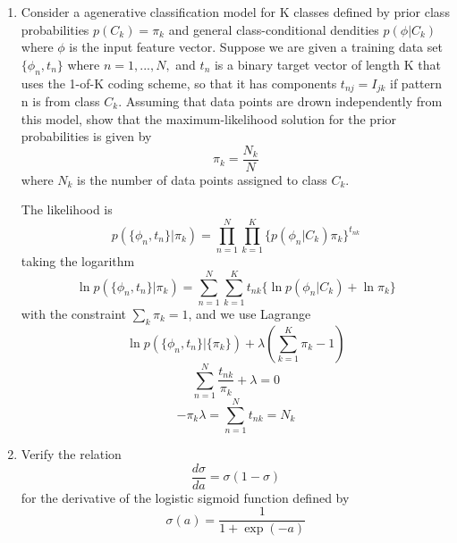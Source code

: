\documentclass[a4paper]{article}
\begin{document}
\begin{enumerate}
		\item
		Consider a agenerative classification model for K classes defined by prior class probabilities $p(C_k)=\pi_k$ and general class-conditional dendities $p(\phi | C_k)$ where $\phi$ is the input feature vector. Suppose we are given a training data set$\{\phi_n,t_n\}$ where $n=1,...,N,$ and $t_n$ is a binary target vector of length K that uses the 1-of-K coding scheme, so that it has components $t_{nj} = I_{jk}$ if pattern n is from class $C_k$. Assuming that data points are drown independently from this model, show that the maximum-likelihood solution for the prior probabilities is given by
		\begin{equation*}
			\pi_k = \frac{N_k}{N}
		\end{equation*}
		where $N_k$ is the number of data points assigned to class $C_k$.
		\begin{solution}
			The likelihood is 
			\begin{equation*}
				p(\{\phi_n,t_n\}|{\pi_k})=\prod_{n=1}^{N}\prod_{k=1}^{K}\{p(\phi_n|C_k)\pi_k\}^{t_{nk}}
			\end{equation*}
			taking the logarithm
			\begin{equation*}
				\ln p(\{\phi_n,t_n\}|{\pi_k})=\sum_{n=1}^{N}\sum_{k=1}^{K}t_{nk}\{\ln p(\phi_n|C_k)+\ln \pi_k\}
			\end{equation*}
			with the constraint $\sum_k \pi_k=1$, and we use Lagrange
			\begin{equation*}
				\ln p(\{\phi_n,t_n\}|\{\pi_k\})+\lambda(\sum_{k=1}^{K}\pi_k-1)
			\end{equation*}
			\begin{equation*}
				\sum_{n=1}^{N}\frac{t_{nk}}{\pi_k} + \lambda = 0
			\end{equation*}
			\begin{equation*}
				-\pi_k\lambda = \sum_{n=1}^{N}t_{nk}=N_k
			\end{equation*}
		\end{solution}
		\item 
		Verify the relation
		\begin{equation*}
			\frac{d\sigma}{da}=\sigma(1-\sigma)
		\end{equation*}
		for the derivative of the logistic sigmoid function defined by
		\begin{equation*}
			\sigma(a) = \frac{1}{1+\exp(-a)}
		\end{equation*}
		\begin{solution}
			\begin{equation*}

\end{equation*}
\end{solution}
\end{enumerate}
\end{document}
